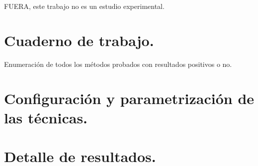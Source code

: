 

FUERA, este trabajo no es un estudio experimental.

\section{Cuaderno de trabajo.}

Enumeración de todos los métodos probados con resultados positivos o no.
\section{Configuración y parametrización de las técnicas.}

\section{Detalle de resultados.}

